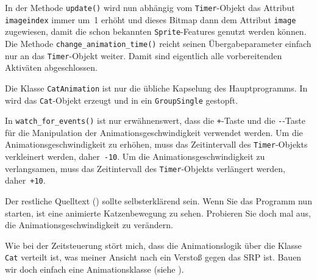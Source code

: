 In der Methode \texttt{update()} wird nun abhängig vom \texttt{Timer}-Objekt das Attribut \texttt{imageindex} immer um~1 erhöht und dieses Bitmap dann dem Attribut \texttt{image} zugewiesen, damit die schon bekannten \texttt{Sprite}-Features genutzt werden können. Die Methode \texttt{change\_\-ani\-ma\-tion\_\-time()} reicht seinen Übergabeparameter einfach nur an das \texttt{Timer}-Objekt weiter. Damit sind eigentlich alle vorbereitenden Aktiväten abgeschlossen.


Die Klasse \texttt{CatAnimation} ist nur die übliche Kapselung des Hauptprogramms. In  wird das \texttt{Cat}-Objekt erzeugt und in ein \texttt{GroupSingle} gestopft.


In \texttt{watch\_for\_events()} ist nur erwähnenswert, dass die \texttt{+}-Taste und die \texttt{-}-Taste für die Manipulation der Animationsgeschwindigkeit verwendet werden. Um die Animationsgeschwindigkeit zu erhöhen, muss das Zeitintervall des \texttt{Timer}-Objekts verkleinert werden, daher~\texttt{-10}. Um die Animationsgeschwindigkeit zu verlangsamen, muss das Zeitintervall des \texttt{Timer}-Objekts verlängert werden, daher~\texttt{+10}. 

\newpage
{} 

Der restliche Quelltext () sollte selbsterklärend sein. Wenn Sie das Programm nun starten, ist eine animierte Katzenbewegung zu sehen. Probieren Sie doch mal aus, die Animationsgeschwindigkeit zu verändern. 


Wie bei der Zeitsteuerung stört mich, dass die Animationslogik über die Klasse \texttt{Cat} verteilt ist, was meiner Ansicht nach ein Verstoß gegen das SRP ist. Bauen wir doch einfach eine Animationsklasse (siehe ).


